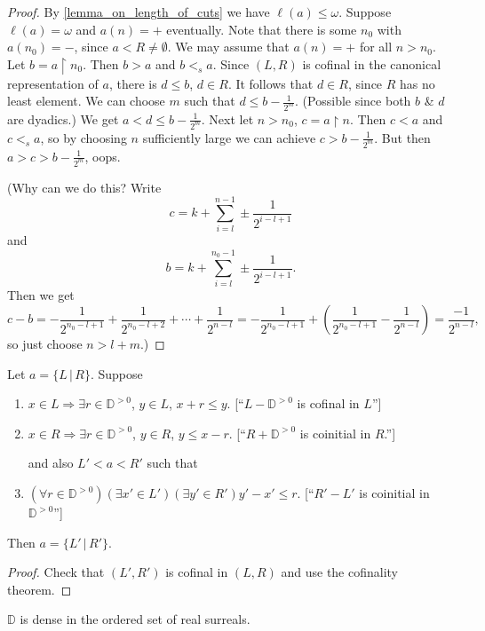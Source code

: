 \begin{proof}
By \eqref{lemma_on_length_of_cuts} we have $\ell(a)\le\omega$. Suppose $\ell(a) = \omega$ and $a(n) = +$ eventually. Note that there is some $n_0$ with $a(n_0) = {-}$, since $a<R\ne\emptyset$. We may assume that $a(n) = {+}$ for all $n>n_0$. Let $b = a\restriction n_0$. Then $b>a$ and $b<_s a$. Since $(L,R)$ is cofinal in the canonical representation of $a$, there is $d\le b$, $d\in R$. It follows that $d\in R$, since $R$ has no least element. We can choose $m$ such that $d\le b - \frac1{2^m}$. (Possible since both $b$ \& $d$ are dyadics.) We get $a<d\le b - \frac1{2^m}$. Next let $n>n_0$, $c = a\restriction n$. Then
$c<a$ and $c <_s a$, so by choosing $n$ sufficiently large we can achieve $c>b-\frac1{2^m}$. But then $a>c>b-\frac{1}{2^m}$, oops.

(Why can we do this? Write
\[ c = k + \sum_{i= l}^{n-1} \pm\frac{1}{2^{i-l+1}}\]
and
\[ b = k + \sum_{i=l}^{n_0-1} \pm\frac{1}{2^{i-l+1}}. \]
Then we get
\[ c-b = -\frac{1}{2^{n_0-l+1}} + \frac{1}{2^{n_0-l+2}} + \cdots + \frac{1}{2^{n-l}} = -\frac{1}{2^{n_0-l+1}} + \left( \frac{1}{2^{n_0-l+1}} - \frac{1}{2^{n-l}} \right) = \frac{-1}{2^{n-l}}, \]
so just choose $n>l+m$.)
\end{proof}

\begin{lemma} \label{3.10}
Let $a = \{L \,|\, R\}$. Suppose
\begin{enumerate}
\item $x\in L \Rightarrow \exists r\in \mathbb{D}^{>0}$, $y\in L$, $x+r\le y$. [``$L-\mathbb{D}^{>0}$ is cofinal in $L$'']
\item $x\in R \Rightarrow \exists r\in \mathbb{D}^{>0}$, $y\in R$, $y\le x-r$. [``$R+\mathbb{D}^{>0}$ is coinitial in $R$.'']

and also $L' < a < R'$ such that
\item $(\forall r\in \mathbb{D}^{>0})(\exists x'\in L')(\exists y'\in R') y'-x'\le r$. [``$R'-L'$ is coinitial in $\mathbb{D}^{>0}$'']
\end{enumerate}
Then $a = \{ L' \,|\, R' \}$. 
\end{lemma}

\begin{proof}
Check that $(L',R')$ is cofinal in $(L,R)$ and use the cofinality theorem.
\end{proof}

\begin{lemma} \label{3.11}
$\mathbb{D}$ is dense in the ordered set of real surreals.
\end{lemma}

